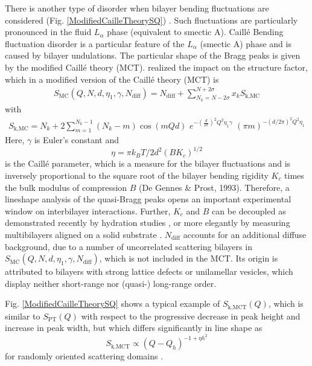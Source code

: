 There is another type of disorder when bilayer bending fluctuations
are considered (Fig. \ref{ModifiedCailleTheorySQ}) \cite{Pabst2003,Fruhwirth2004}. Such
fluctuations are particularly pronounced in the fluid $L_\alpha$
phase (equivalent to smectic A). Caill\'e Bending fluctuation
disorder is a particular feature of the $L_\alpha$ (smectic A) phase
and is caused by bilayer undulations. The particular shape of the
Bragg peaks is given by the modified Caill\'e theory (MCT).
\cite{Caille1972} realized the impact on the structure factor, which
in a modified version \cite{Zhang1994} of the Caill\'e theory (MCT)
is
\begin{align}
S_\text{MC}(Q,N,d,\eta_1,\gamma, N_\text{diff}) = N_\text{diff}+
\sum_{N_k=N-2\sigma}^{N+2\sigma} x_k S_\text{k,MC}
\end{align}
with
\begin{align}
S_\text{k,MC} = N_k + 2 \sum_{m=1}^{N_k-1} (N_k-m) \cos(mQd) \,\,
e^{ -\left(\frac{d}{2\pi}\right)^2 Q^2 \eta_1 \gamma } \,\, (\pi
m)^{-(d/2\pi)^2Q^2\eta_1}
\end{align}
Here, $\gamma$ is Euler's constant and
$$ \eta = \pi k_B T / 2d^2(BK_c)^{1/2}$$
is the Caill\'e parameter, which is a measure for the bilayer
fluctuations and is inversely proportional to the square root of the
bilayer bending rigidity $K_c$ times the bulk modulus of compression
$B$ (De Gennes \& Prost, 1993). Therefore, a lineshape analysis of
the quasi-Bragg peaks opens an important experimental window on
interbilayer interactions. Further, $K_c$ and $B$ can be decoupled
as demonstrated recently by hydration studies
\cite{Petrache1998,Pabst2003}, or more elegantly by measuring
multibilayers aligned on a solid substrate \cite{Lyatskaya2000}.
$N_\text{diff}$ accounts for an additional diffuse background, due
to a number of uncorrelated scattering bilayers in
$S_\text{MC}(Q,N,d,\eta_1,\gamma, N_\text{diff}) $, which is not
included in the MCT. Its origin is attributed to bilayers with
strong lattice defects or unilamellar vesicles, which display
neither short-range nor (quasi-) long-range order.

Fig. \ref{ModifiedCailleTheorySQ} shows a typical example of
$S_\text{k,MCT}(Q)$, which is similar to $S_\text{PT}(Q)$ with
respect to the progressive decrease in peak height and increase in
peak width, but which differs significantly in line shape as
$$
S_\text{k,MCT} \propto (Q-Q_h)^{-1+\eta h^2}
$$
for randomly oriented scattering domains \cite{Roux1988,Zhang1994}.


